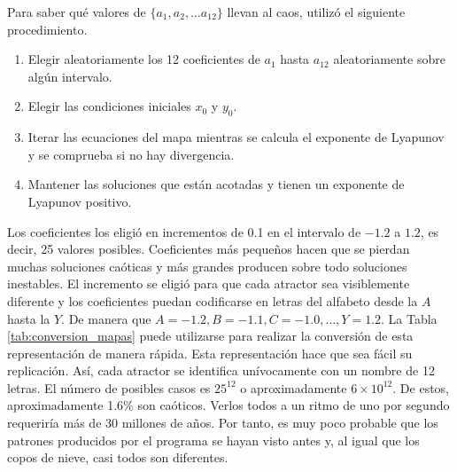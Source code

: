         Para saber qué valores de $\{a_{1}, a_{2}, \ldots a_{12}\}$ llevan al caos, \cite{Sprott1993} utilizó el siguiente procedimiento.

        \begin{enumerate}
            \item Elegir aleatoriamente los 12 coeficientes de $a_{1}$ hasta $a_{12}$ aleatoriamente sobre algún intervalo.
            \item Elegir las condiciones iniciales $x_{0}$ y $y_{0}$.
            \item Iterar las ecuaciones del mapa mientras se calcula el exponente de Lyapunov y se comprueba si no hay divergencia.
            \item Mantener las soluciones que están acotadas y tienen un exponente de Lyapunov positivo.
        \end{enumerate}

        Los coeficientes los eligió en incrementos de 0.1 en el intervalo de $-1.2$ a $1.2$, es decir, 25 valores posibles. Coeficientes más pequeños hacen que se pierdan muchas soluciones caóticas y más grandes producen sobre todo soluciones inestables. El incremento se eligió para que cada atractor sea visiblemente diferente y los coeficientes puedan codificarse en letras del alfabeto desde la $A$ hasta la $Y$. De manera que $A = -1.2, B = -1.1, C = -1.0, \ldots, Y = 1.2$. La Tabla \ref{tab:conversion_mapas} puede utilizarse para realizar la conversión de esta representación de manera rápida. Esta representación hace que sea fácil su replicación. Así, cada atractor se identifica unívocamente con un nombre de 12 letras. El número de posibles casos es $25^{12}$ o aproximadamente $6\times 10^{12}$. De estos, aproximadamente 1.6\% son caóticos. Verlos todos a un ritmo de uno por segundo requeriría más de 30 millones de años. Por tanto, es muy poco probable que los patrones producidos por el programa se hayan visto antes y, al igual que los copos de nieve, casi todos son diferentes.

